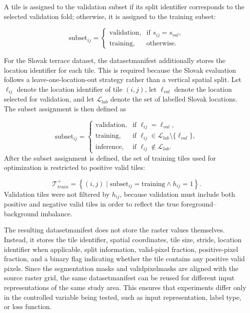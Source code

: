 A tile is assigned to the validation subset if its split identifier corresponds to the selected validation fold; otherwise, it is assigned to the training subset:

\begin{equation}
\text{subset}_{ij}
=
\begin{cases}
\text{validation}, & \text{if } s_{ij}=s_{val},\\
\text{training}, & \text{otherwise}.
\end{cases}
\label{eq:subset_assignment}
\end{equation}

For the Slovak terrace dataset, the \gls{datasetmanifest} additionally stores the location identifier for each tile. This is required because the Slovak evaluation follows a leave-one-location-out strategy rather than a vertical spatial split. Let \(\ell_{ij}\) denote the location identifier of tile \((i,j)\), let \(\ell_{val}\) denote the location selected for validation, and let \(\mathcal{L}_{lab}\) denote the set of labelled Slovak locations. The subset assignment is then defined as

\begin{equation}
\text{subset}_{ij}
=
\begin{cases}
\text{validation}, & \text{if } \ell_{ij}=\ell_{val},\\
\text{training}, & \text{if } \ell_{ij}\in \mathcal{L}_{lab} \setminus \{\ell_{val}\},\\
\text{inference}, & \text{if } \ell_{ij}\notin \mathcal{L}_{lab}.
\end{cases}
\label{eq:loocv_location_split}
\end{equation}
After the subset assignment is defined, the set of training tiles used for optimization is restricted to positive valid tiles:

\begin{equation}
\mathcal{T}_{train}^{+}
=
\left\{
(i,j) \mid \text{subset}_{ij}=\text{training} \land h_{ij}=1
\right\}.
\label{eq:positive_training_tiles}
\end{equation}
Validation tiles were not filtered by \(h_{ij}\), because validation must include both positive and negative valid tiles in order to reflect the true foreground--background imbalance.

The resulting \gls{datasetmanifest} does not store the raster values themselves. Instead, it stores the tile identifier, spatial coordinates, tile size, stride, location identifier when applicable, split information, valid-pixel fraction, positive-pixel fraction, and a binary flag indicating whether the tile contains any positive valid pixels. Since the segmentation masks and \glspl{validpixelmask} are aligned with the source raster grid, the same \gls{datasetmanifest} can be reused for different input representations of the same study area. This ensures that experiments differ only in the controlled variable being tested, such as input representation, label type, or loss function.

